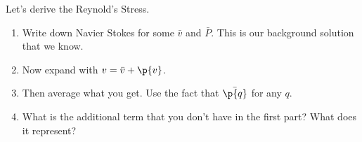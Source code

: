 
   Let's derive the Reynold's Stress.       
     \begin{enumerate}
         \item Write down Navier Stokes for some $\bar{v}$ and $\bar{P}$.  This
             is our background solution that we know.   
         \item Now expand with $v=\bar{v}+\p{v}$.
         \item Then average what you get.  Use the fact that $\bar{\p{q}}$ for
             any $q$.
         \item What is the additional term that you don't have in the first
             part?  What does it represent?
     \end{enumerate}

    
    

%
%
%

